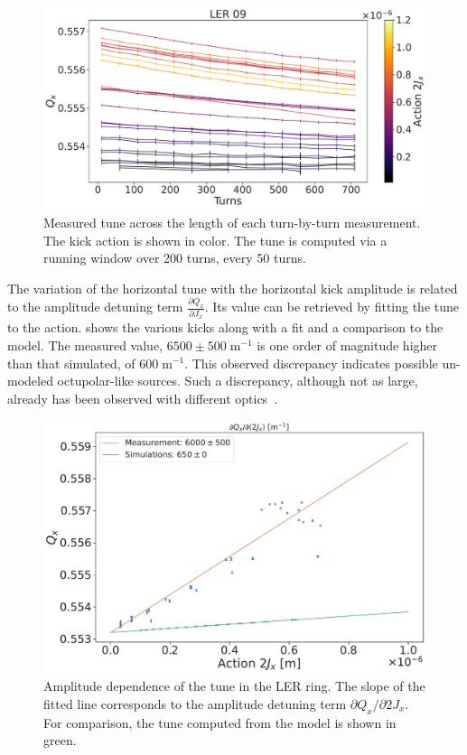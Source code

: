 \begin{figure}[!htb]
    \centering
    \includegraphics[width=0.8\linewidth]{images/kek/LER_detuned_ampdet.pdf}
    \caption{Measured tune across the length of each turn-by-turn measurement.
             The kick action is shown in color. The tune is computed
             via a running window over 200 turns, every 50 turns.}
    \label{fig:kek:ler_full_tune_ampdet}
\end{figure}

The variation of the horizontal tune with the horizontal kick amplitude is related to the
amplitude detuning term $\frac{\partial Q_x}{\partial J_x}$. Its value can be retrieved by fitting
the tune to the action.  shows the various kicks along with a fit and a
comparison to the model. The measured value, $6500 \pm 500\;\text{m}^{-1}$ is one order of magnitude higher than
that simulated, of $600\;\text{m}^{-1}$. This observed discrepancy indicates possible un-modeled octupolar-like sources.
Such a discrepancy, although not as large, already has been observed with different
optics~\cite{keintzel_jacqueline_beam_2022}.

\begin{figure}[!htb]
    \centering
    \includegraphics[width=0.7\linewidth]{images/kek/amplitude_detuning.pdf}
    \caption{Amplitude dependence of the tune in the LER ring. The slope of the fitted line corresponds to
    the amplitude detuning term $\partial Q_x/\partial 2J_x$. For comparison, the tune computed 
    from the model is shown in green.}
    \label{fig:kek:ler_ampdet}
\end{figure}



